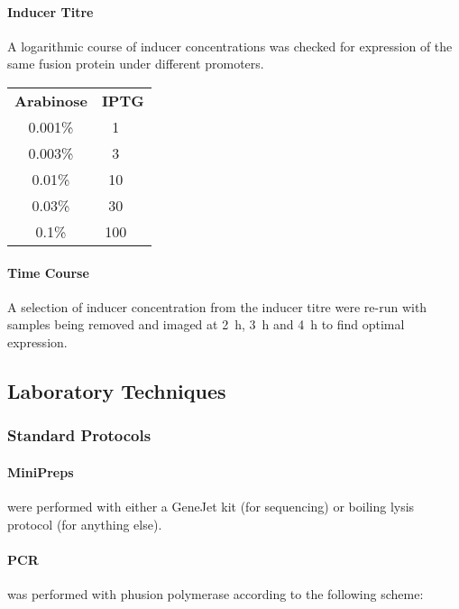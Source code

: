 \documentclass[../main.tex]{subfiles}
\begin{document}
\paragraph{Inducer Titre} A logarithmic course of inducer concentrations was checked for expression of the same fusion protein under different promoters.

\begin{center}
\begin{tabular}{cc}
\textbf{Arabinose}	&	\textbf{IPTG} 	\\
0.001\%	&	\SI{1}{\micro\Molar}\\
0.003\%	&	\SI{3}{\micro\Molar}\\
0.01\%	&	\SI{10}{\micro\Molar}\\
0.03\%	&	\SI{30}{\micro\Molar}\\
0.1\%	&	\SI{100}{\micro\Molar}\\

\end{tabular}
\end{center}

\paragraph{Time Course}	A selection of inducer concentration from the inducer titre were re-run with samples being removed and imaged at \SI{2}{\hour}, \SI{3}{\hour} and \SI{4}{\hour} to find optimal expression.
  
\subsection{Laboratory Techniques}

\subsubsection{Standard Protocols}
\paragraph{MiniPreps} were performed with either a GeneJet kit (for sequencing) or boiling lysis protocol (for anything else).
\paragraph{PCR} was performed with phusion polymerase according to the following scheme:
\end{document}
